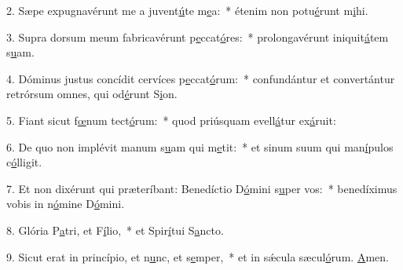 2. Sæpe expugnavérunt me a juvent\uline{ú}te m\uline{e}a:~* étenim non potu\uline{é}runt m\uline{i}hi.\par 
3. Supra dorsum meum fabricavérunt p\uline{e}ccat\uline{ó}res:~* prolongavérunt iniquit\uline{á}tem s\uline{u}am.\par 
4. Dóminus justus concídit cervíces p\uline{e}ccat\uline{ó}rum:~* confundántur et convertántur retrórsum omnes, qui od\uline{é}runt S\uline{i}on.\par 
5. Fiant sicut f\uline{œ}num tect\uline{ó}rum:~* quod priúsquam evell\uline{á}tur ex\uline{á}ruit:\par 
6. De quo non implévit manum s\uline{u}am qui m\uline{e}tit:~* et sinum suum qui man\uline{í}pulos c\uline{ó}lligit.\par 
7. Et non dixérunt qui præteríbant: Benedíctio D\uline{ó}mini s\uline{u}per vos:~* benedíximus vobis in n\uline{ó}mine D\uline{ó}mini.\par 
8. Glória P\uline{a}tri, et F\uline{í}lio,~* et Spir\uline{í}tui S\uline{a}ncto.\par 
9. Sicut erat in princípio, et n\uline{u}nc, et s\uline{e}mper,~* et in sǽcula sæcul\uline{ó}rum. \uline{A}men.\par 
